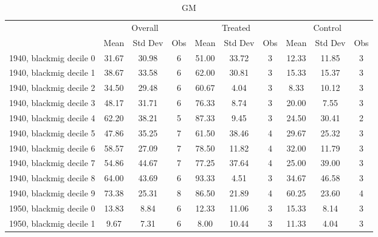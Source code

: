 \begin{table}[htbp]\centering
\def\sym#1{\ifmmode^{#1}\else\(^{#1}\)\fi}
\caption{GM \label{tab1}}
\begin{tabular}{l*{3}{ccc}}
\toprule
                    &\multicolumn{3}{c}{Overall}           &\multicolumn{3}{c}{Treated}           &\multicolumn{3}{c}{Control}           \\
                    &        Mean&     Std Dev&         Obs&        Mean&     Std Dev&         Obs&        Mean&     Std Dev&         Obs\\
\midrule
1940, blackmig decile 0&       31.67&       30.98&           6&       51.00&       33.72&           3&       12.33&       11.85&           3\\
1940, blackmig decile 1&       38.67&       33.58&           6&       62.00&       30.81&           3&       15.33&       15.37&           3\\
1940, blackmig decile 2&       34.50&       29.48&           6&       60.67&        4.04&           3&        8.33&       10.12&           3\\
1940, blackmig decile 3&       48.17&       31.71&           6&       76.33&        8.74&           3&       20.00&        7.55&           3\\
1940, blackmig decile 4&       62.20&       38.21&           5&       87.33&        9.45&           3&       24.50&       30.41&           2\\
1940, blackmig decile 5&       47.86&       35.25&           7&       61.50&       38.46&           4&       29.67&       25.32&           3\\
1940, blackmig decile 6&       58.57&       27.09&           7&       78.50&       11.82&           4&       32.00&       11.79&           3\\
1940, blackmig decile 7&       54.86&       44.67&           7&       77.25&       37.64&           4&       25.00&       39.00&           3\\
1940, blackmig decile 8&       64.00&       43.69&           6&       93.33&        4.51&           3&       34.67&       46.58&           3\\
1940, blackmig decile 9&       73.38&       25.31&           8&       86.50&       21.89&           4&       60.25&       23.60&           4\\
1950, blackmig decile 0&       13.83&        8.84&           6&       12.33&       11.06&           3&       15.33&        8.14&           3\\
1950, blackmig decile 1&        9.67&        7.31&           6&        8.00&       10.44&           3&       11.33&        4.04&           3\\

\end{tabular}
\end{table}
